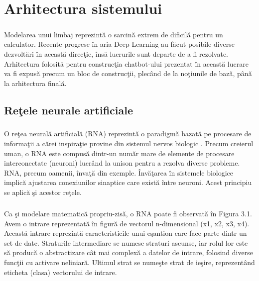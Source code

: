 \chapter{Arhitectura sistemului}

\paragraph{}
Modelarea unui limbaj reprezint\u a o sarcin\u a extrem de dificil\u a pentru un calculator. Recente progrese \^ in aria Deep Learning au f\u acut posibile diverse dezvolt\u ari \^ in aceast\u a direc\c tie, \^ ins\u a lucrurile sunt departe de a fi rezolvate. Arhitectura folosit\u a pentru construc\c tia chatbot-ului prezentat \^ in aceast\u a lucrare va fi expus\u a precum un bloc de construc\c tii, plec\^ and de la no\c tiunile de baz\u a, p\^ an\u a la arhitectura final\u a.

\section{Re\c tele neurale artificiale}

\paragraph{}
O re\c tea neural\u a artificial\u a (RNA) reprezint\u a o paradigm\u a bazat\u a pe procesare de informa\c tii a c\u arei inspira\c tie provine din sistemul nervos biologic \cite{biological-inpiration}. Precum creierul uman, o RNA este compus\u a dintr-un num\u ar mare de elemente de procesare interconectate (neuroni) lucr\^ and la unison pentru a rezolva diverse probleme. RNA, precum oamenii, \^ inva\c t\u a din exemple. \^ Inv\u a\c tarea \^ in sistemele biologice implic\u a ajustarea conexiunilor sinaptice care exist\u a \^ intre neuroni. Acest principiu se aplic\u a \c si acestor re\c tele.

\paragraph{}
Ca \c si modelare matematic\u a propriu-zis\u a, o RNA poate fi observat\u a \^ in Figura 3.1. Avem o intrare reprezentat\u a \^ in figur\u a de vectorul n-dimensional (x1, x2, x3, x4). Aceast\u a intrare reprezint\u a caracteristicile unui e\c santion care face parte dintr-un set de date. Straturile intermediare se numesc straturi ascunse, iar rolul lor este s\u a produc\u a o abstractizare c\^ at mai complex\u a a datelor de intrare, folosind diverse func\c tii cu activare neliniar\u a. Ultimul strat se nume\c ste strat de ie\c sire, reprezent\^ and eticheta (clasa) vectorului de intrare.

